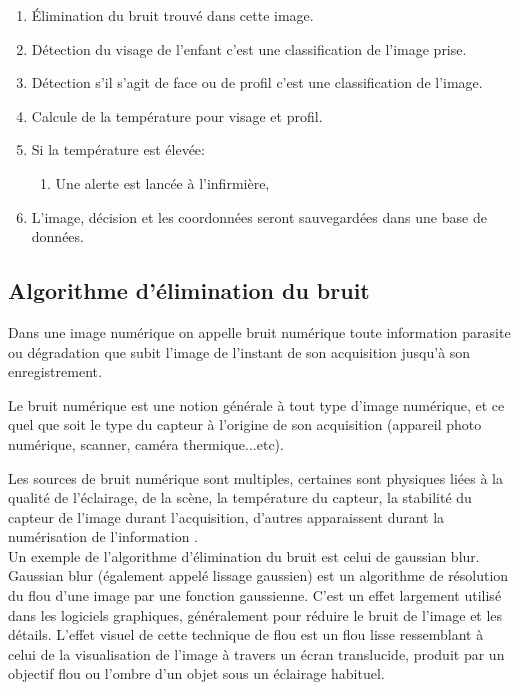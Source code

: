 \documentclass[12pt]{article}
\begin{document}
\begin{enumerate}
\begin{enumerate}
	\item \' Elimination du bruit trouvé dans cette image.
	\item Détection du visage de l’enfant c'est une classification de l’image prise.
	\item Détection s’il s’agit  de face ou de profil c'est une classification de l’image.
	\item Calcule de la température pour visage et profil. 
	\item Si la température est élevée:
	\begin{enumerate}
		\item Une alerte est lancée à l’infirmière,
	\end{enumerate}
	\item L'image, décision et les coordonnées seront sauvegardées dans une base de données.
\end{enumerate}

\subsection{Algorithme d'élimination du bruit}
Dans une image numérique on appelle bruit numérique toute information parasite ou dégradation que subit l'image de l'instant de son acquisition jusqu'à son enregistrement. 

Le bruit numérique est une notion générale à tout type d'image numérique, et ce quel que soit le type du capteur à l'origine de son acquisition (appareil photo numérique, scanner, caméra thermique...etc). 

Les sources de bruit numérique sont multiples, certaines sont physiques liées à la qualité de l’éclairage, de la scène, la température du capteur, la stabilité du capteur de l'image durant l'acquisition, d'autres apparaissent durant la numérisation de l'information \cite{48}.\\

Un exemple de l'algorithme d'élimination du bruit est celui de gaussian blur.\\
Gaussian blur (également appelé lissage gaussien) est un algorithme de résolution du flou d'une image par une fonction gaussienne. C'est un effet largement utilisé dans les logiciels graphiques, généralement pour réduire le bruit de l'image et les détails. L’effet visuel de cette technique de flou est un flou lisse ressemblant à celui de la visualisation de l’image à travers un écran translucide, produit par un objectif flou ou l’ombre d’un objet sous un éclairage habituel. 


\end{enumerate}
\end{document}
